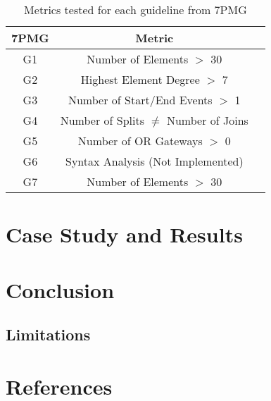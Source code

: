 \documentclass{llncs}
\begin{document}
\begin{table}[h]
	\label{Metrics}
	\caption{Metrics tested for each guideline from 7PMG}
	\centering
	\begin{tabular}{ccc}
		\hline
		7PMG 	& Metric 									\\
		\hline
		G1 		& Number of Elements $>$ 30 				\\
		G2 		& Highest Element Degree $>$ 7				\\  
		G3 		& Number of Start/End Events $>$ 1			\\
		G4 		& Number of Splits $\neq$ Number of Joins 	\\ 
		G5 		& Number of OR Gateways $>$ 0				\\
		G6 		& Syntax Analysis (Not Implemented) 		\\
		G7		& Number of Elements $>$ 30 				\\
		\hline
	\end{tabular} 
\end{table}



\section{Case Study and Results}\label{CaseStudy}
\section{Conclusion}\label{Conclusion}
\subsection{Limitations}



\section{References}\label{References}



\end{document}

